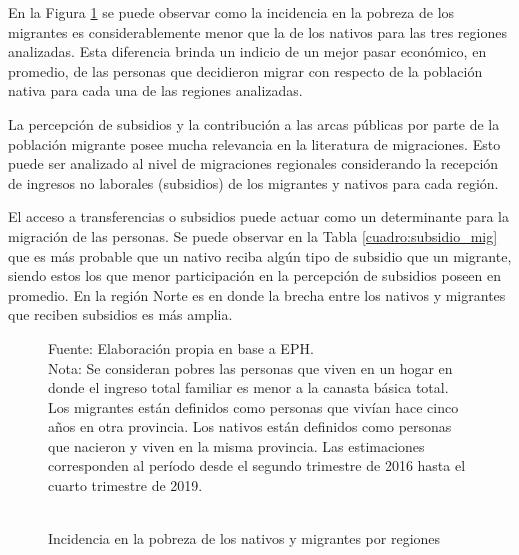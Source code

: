 \documentclass[12pt,a4paper]{article}
\begin{document}
En la Figura \ref{figure:pobre_mig} se puede observar como la incidencia en la pobreza de los migrantes es considerablemente menor que la de los nativos para las tres regiones analizadas. Esta diferencia brinda un indicio de un mejor pasar económico, en promedio, de las personas que decidieron migrar con respecto de la población nativa para cada una de las regiones analizadas.

La percepción de subsidios y la contribución a las arcas públicas por parte de la población migrante posee mucha relevancia en la literatura de migraciones. Esto puede ser analizado al nivel de migraciones regionales considerando la recepción de ingresos no laborales (subsidios) de los migrantes y nativos para cada región. 

El acceso a transferencias o subsidios puede actuar como un determinante para la migración de las personas. Se puede observar en la Tabla \ref{cuadro:subsidio_mig} que es más probable que un nativo reciba algún tipo de subsidio que un migrante, siendo estos los que menor participación en la percepción de subsidios poseen en promedio. En la región Norte es en donde la brecha entre los nativos y migrantes que reciben subsidios es más amplia.

\newpage
\begin{figure}[ht!]
\begin{center}
\caption{\\Incidencia en la pobreza de los nativos y migrantes por regiones}
\label{figure:pobre_mig}
 
\end{center}
\begin{flushleft}
\begin{scriptsize}
Fuente: Elaboración propia en base a EPH.\\
Nota: Se consideran pobres las personas que viven en un hogar en donde el ingreso total familiar es menor a la canasta básica total. Los migrantes están definidos como personas que vivían hace cinco años en otra provincia. Los nativos están definidos como personas que nacieron y viven en la misma provincia. Las estimaciones corresponden al período desde el segundo trimestre de 2016 hasta el cuarto trimestre de 2019.\\
\end{scriptsize}
\end{flushleft}
\end{figure}
\end{document}
